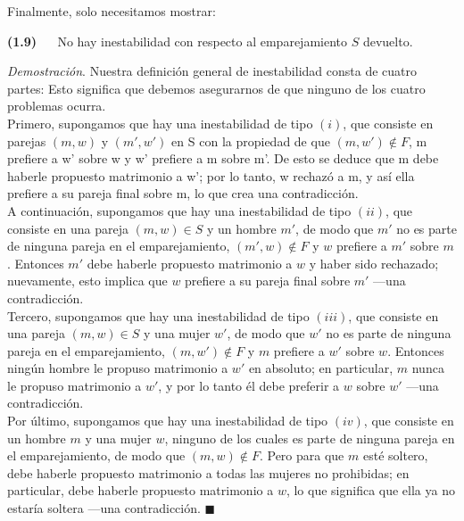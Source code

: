 \documentclass{article}
\begin{document}
Finalmente, solo necesitamos mostrar:

\begin{flushleft}
    \textbf{(1.9)} $\quad$ No hay inestabilidad con respecto al emparejamiento $S$ devuelto.
\end{flushleft}

\textit{Demostración}. Nuestra definición general de inestabilidad consta de cuatro partes: Esto significa que debemos asegurarnos de que ninguno de los cuatro problemas ocurra.\\

Primero, supongamos que hay una inestabilidad de tipo $(i)$, que consiste en parejas $(m, w)$ y $(m', w')$ en S con la propiedad de que $(m, w') \not\in F$, m prefiere a w' sobre w y w' prefiere a m sobre m'. De esto se deduce que m debe haberle propuesto matrimonio a w'; por lo tanto, w rechazó a m, y así ella prefiere a su pareja final sobre m, lo que crea una contradicción.\\

A continuación, supongamos que hay una inestabilidad de tipo $(ii)$, que consiste en una pareja $(m, w) \in S$ y un hombre $m'$, de modo que $m'$ no es parte de ninguna pareja en el emparejamiento, $(m', w) \not\in F$ y $w$ prefiere a $m'$ sobre $m$. Entonces $m'$ debe haberle propuesto matrimonio a $w$ y haber sido rechazado; nuevamente, esto implica que $w$ prefiere a su pareja final sobre $m'$ —una contradicción.\\

Tercero, supongamos que hay una inestabilidad de tipo $(iii)$, que consiste en una pareja $(m, w) \in S$ y una mujer $w'$, de modo que $w'$ no es parte de ninguna pareja en el emparejamiento, $(m, w') \not\in F$ y $m$ prefiere a $w'$ sobre $w$. Entonces ningún hombre le propuso matrimonio a $w'$ en absoluto; en particular, $m$ nunca le propuso matrimonio a $w'$, y por lo tanto él debe preferir a $w$ sobre $w'$ —una contradicción.\\

Por último, supongamos que hay una inestabilidad de tipo $(iv)$, que consiste en un hombre $m$ y una mujer $w$, ninguno de los cuales es parte de ninguna pareja en el emparejamiento, de modo que $(m, w) \not\in F$. Pero para que $m$ esté soltero, debe haberle propuesto matrimonio a todas las mujeres no prohibidas; en particular, debe haberle propuesto matrimonio a $w$, lo que significa que ella ya no estaría soltera —una contradicción. $\blacksquare$\\
\end{document}
